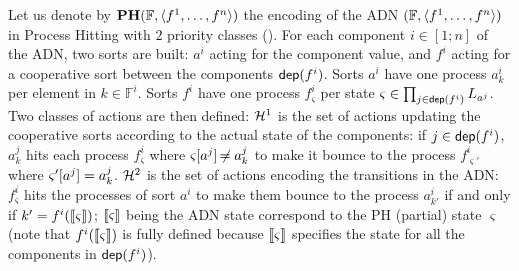 Let us denote by $\mathbf{PH}(\mathbb F, \langle f^1, \dots, f^n\rangle)$ the encoding of the ADN $(\mathbb F, \langle f^1, \dots, f^n\rangle)$ in Process Hitting with $2$ priority
classes ().
For each component $i\in[1;n]$ of the ADN, two sorts are built: $a^i$ acting for the component
value, and $f^i$ acting for a cooperative sort between the components $\mathsf{dep}(f^i)$.
Sorts $a^i$ have one process $a^i_k$ per element in $k\in\mathbb F^i$.
Sorts $f^i$ have one process $f^i_\varsigma$ per state $\varsigma \in \prod_{j\in\mathsf{dep}(f^i)}
L_{a^j}$.
Two classes of actions are then defined:
$\mathcal{H}^1$ is the set of actions updating the cooperative sorts according to the actual state of the
components:
if $j\in\mathsf{dep}(f^i)$, $a^j_k$ hits each process $f^i_\varsigma$ where $\varsigma[{a^j}]\not\nobreak\mkern -2mu =
a^j_k$ to make it bounce to the process $f^i_{\varsigma'}$ where $\varsigma'[{a^j}]=a^j_k$.
$\mathcal{H}^2$ is the set of actions encoding the transitions in the ADN:
$f^i_\varsigma$ hits the processes of sort $a^i$ to make them bounce to the process
$a^i_{k'}$ if and only if $k'=f^i(\llbracket\varsigma\rrbracket)$;
$\llbracket\varsigma\rrbracket$ being the ADN state correspond to the PH (partial) state $\varsigma$ (note that
$f^i(\llbracket\varsigma\rrbracket)$ is fully defined because $\llbracket\varsigma\rrbracket$ specifies the state for all
the components in $\mathsf{dep}(f^i)$).

